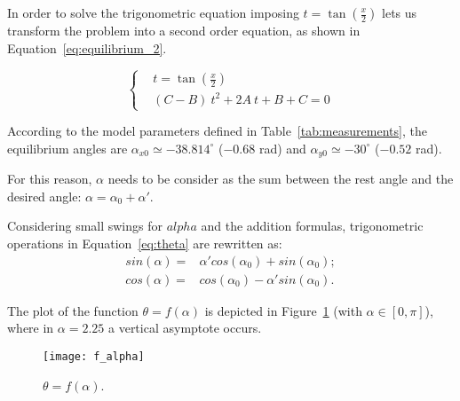 In order to solve the trigonometric equation imposing $t=\tan(\frac{x}{2})$
lets us transform the problem into a second order equation, as shown in
Equation~\ref{eq:equilibrium_2}.

\begin{equation}
\left\{
\begin{aligned}
&	t=\tan(\frac{x}{2})\\
&	(C-B)\ t^2 + 2A\ t + B + C = 0
\end{aligned}
\right.
\label{eq:equilibrium_2}
\end{equation}

According to the model parameters defined in Table~\ref{tab:measurements},
the equilibrium angles are $\alpha_{x0}\simeq-38.814^{\circ}$ ($-0.68$ rad) and
$\alpha_{y0}\simeq-30^{\circ}$ ($-0.52$ rad).

For this reason, $\alpha$ needs to be consider as the sum between the rest angle
and the desired angle: $\alpha = \alpha_0 + \alpha'$.

Considering small swings for $alpha$ and the addition formulas\footnotemark,
 trigonometric operations in Equation~\ref{eq:theta} are rewritten as:
\begin{equation}
\begin{aligned}
sin(\alpha) =& \alpha' cos(\alpha_0) + sin(\alpha_0);\\
cos(\alpha) =& cos(\alpha_0) - \alpha' sin(\alpha_0).
\end{aligned}
\label{eq:new_theta}
\end{equation}


The plot of the function $\theta = f(\alpha)$ is depicted in
Figure~\ref{fig:f_alpha} (with $\alpha \in [0, \pi]$), where in $\alpha=2.25$ a
vertical asymptote occurs.

\begin{figure}[htb]
  \centering

  \texttt{[image: f\_alpha]}
  \caption{$\theta = f(\alpha)$.}
  \label{fig:f_alpha}
\end{figure}
 
